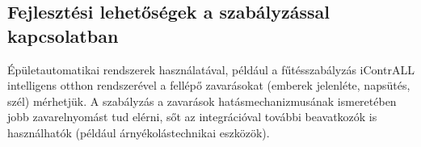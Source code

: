 \subsection{Fejlesztési lehetőségek a szabályzással kapcsolatban}
	
Épületautomatikai rendszerek használatával, például a fűtésszabályzás iContrALL intelligens otthon rendszerével a fellépő zavarásokat (emberek jelenléte, napsütés, szél) mérhetjük. A szabályzás a zavarások hatásmechanizmusának ismeretében jobb zavarelnyomást tud elérni, sőt az integrációval további beavatkozók is használhatók (például árnyékolástechnikai eszközök).

